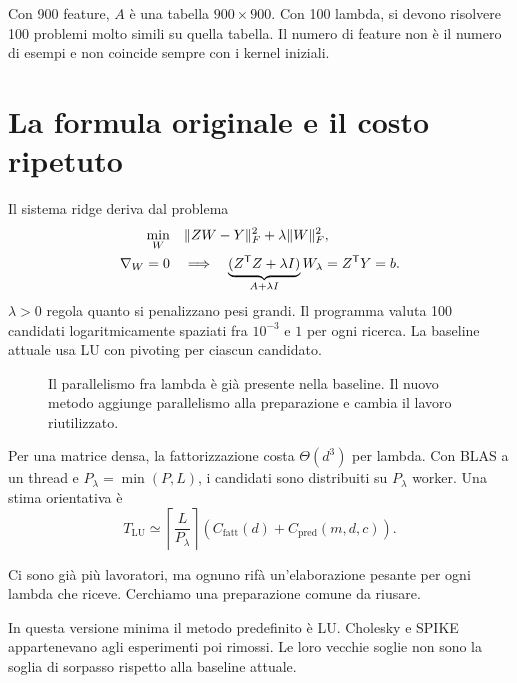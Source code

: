 \documentclass[11pt,a4paper]{article}
\newcommand{\semplice}[1]{\begin{idea}[title=In parole semplici]#1\end{idea}}
\DeclarePairedDelimiter{\norm}{\lVert}{\rVert}
\newcommand{\T}{\mathsf{T}}
\newcommand{\page}[1]{\clearpage\section{#1}}
\begin{document}
\semplice{Con 900 feature, $A$ è una tabella $900\times900$. Con 100 lambda,
si devono risolvere 100 problemi molto simili su quella tabella. Il numero
di feature non è il numero di esempi e non coincide sempre con i kernel iniziali.}
\page{La formula originale e il costo ripetuto}
Il sistema ridge deriva dal problema
\begin{align}
\min_W\quad&\norm{ZW-Y}_F^2+\lambda\norm{W}_F^2,\\
\nabla_W=0\quad&\Longrightarrow\quad
\underbrace{(Z^{\T}Z+\lambda I)}_{A+\lambda I}W_\lambda=Z^{\T}Y=b.
\end{align}
$\lambda>0$ regola quanto si penalizzano pesi grandi. Il programma valuta
100 candidati logaritmicamente spaziati fra $10^{-3}$ e $1$ per ogni ricerca.
La baseline attuale usa LU con pivoting per ciascun candidato.
\begin{figure}[H]\centering
{}
\caption{Il parallelismo fra lambda è già presente nella baseline. Il nuovo metodo aggiunge parallelismo alla preparazione e cambia il lavoro riutilizzato.}
\end{figure}
Per una matrice densa, la fattorizzazione costa $\Theta(d^3)$ per lambda.
Con BLAS a un thread e $P_\lambda=\min(P,L)$, i candidati sono distribuiti
su $P_\lambda$ worker. Una stima orientativa è
\[
T_{\mathrm{LU}}\simeq
\left\lceil\frac{L}{P_\lambda}\right\rceil
\left(C_{\mathrm{fatt}}(d)+C_{\mathrm{pred}}(m,d,c)\right).
\]
\semplice{Ci sono già più lavoratori, ma ognuno rifà un'elaborazione pesante
per ogni lambda che riceve. Cerchiamo una preparazione comune da riusare.}
\begin{attenzione}[title=Confronto preciso]
In questa versione minima il metodo predefinito è LU. Cholesky e SPIKE
appartenevano agli esperimenti poi rimossi. Le loro vecchie soglie non sono
la soglia di sorpasso rispetto alla baseline attuale.
\end{attenzione}
\end{document}
